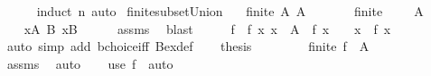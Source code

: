 \begin{isabellebody}
\ \ \ \ \isamarkupfalse%
\ {\isacharparenleft}{\kern0pt}induct\ n{\isacharparenright}{\kern0pt}\ auto\isanewline
{}\isamarkupfalse%
%
\endisatagproof
{\isafoldproof}%
%
\isadelimproof
\isanewline
%
\endisadelimproof
\isanewline
{}\isamarkupfalse%
\ finite{\isacharunderscore}{\kern0pt}subset{\isacharunderscore}{\kern0pt}Union{\isacharcolon}{\kern0pt}\isanewline
\ \ \ {\isachardoublequoteopen}finite\ A{\isachardoublequoteclose}\ {\isachardoublequoteopen}A\ {\isasymsubseteq}\ {\isasymUnion}{\isasymB}{\isachardoublequoteclose}\isanewline
\ \ \ {\isasymF}\ \ {\isachardoublequoteopen}finite\ {\isasymF}{\isachardoublequoteclose}\ {\isachardoublequoteopen}{\isasymF}\ {\isasymsubseteq}\ {\isasymB}{\isachardoublequoteclose}\ {\isachardoublequoteopen}A\ {\isasymsubseteq}\ {\isasymUnion}{\isasymF}{\isachardoublequoteclose}\isanewline
%
\isadelimproof
%
\endisadelimproof
%
\isatagproof
{}\isamarkupfalse%
\ {\isacharminus}{\kern0pt}\isanewline
\ \ \isamarkupfalse%
\ {\isachardoublequoteopen}{\isasymforall}x{\isasymin}A{\isachardot}{\kern0pt}\ {\isasymexists}B{\isasymin}{\isasymB}{\isachardot}{\kern0pt}\ x{\isasymin}B{\isachardoublequoteclose}\isanewline
\ \ \ \ \isamarkupfalse%
\ assms\ \isamarkupfalse%
\ blast\isanewline
\ \ \isamarkupfalse%
\ \isamarkupfalse%
\ f\ \ f{\isacharcolon}{\kern0pt}\ {\isachardoublequoteopen}{\isasymAnd}x{\isachardot}{\kern0pt}\ x\ {\isasymin}\ A\ {\isasymLongrightarrow}\ f\ x\ {\isasymin}\ {\isasymB}\ {\isasymand}\ x\ {\isasymin}\ f\ x{\isachardoublequoteclose}\isanewline
\ \ \ \ \isamarkupfalse%
\ {\isacharparenleft}{\kern0pt}auto\ simp\ add{\isacharcolon}{\kern0pt}\ bchoice{\isacharunderscore}{\kern0pt}iff\ Bex{\isacharunderscore}{\kern0pt}def{\isacharparenright}{\kern0pt}\isanewline
\ \ \isamarkupfalse%
\ thesis\isanewline
\ \ \isamarkupfalse%
\isanewline
\ \ \ \ \isamarkupfalse%
\ {\isachardoublequoteopen}finite\ {\isacharparenleft}{\kern0pt}f\ {\isacharbackquote}{\kern0pt}\ A{\isacharparenright}{\kern0pt}{\isachardoublequoteclose}\isanewline
\ \ \ \ \ \ \isamarkupfalse%
\ assms\ \isamarkupfalse%
\ auto\isanewline
\ \ \isamarkupfalse%
\ {\isacharparenleft}{\kern0pt}use\ f\ \ auto{\isacharparenright}{\kern0pt}\isanewline
{}\isamarkupfalse%
%
\endisatagproof
{\isafoldproof}%

\end{isabellebody}
